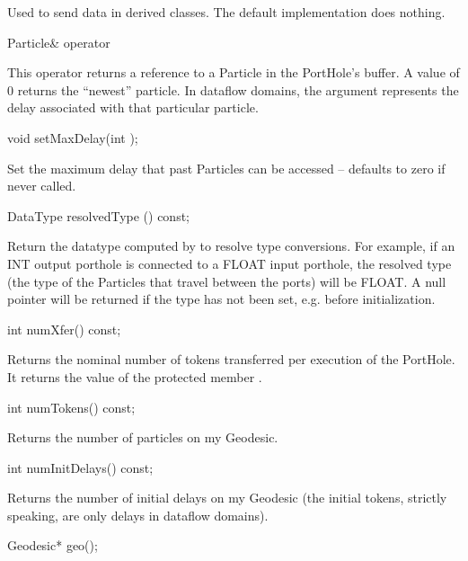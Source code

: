 Used to send data in derived classes.  The default implementation
does nothing.

\begin{example}
Particle& operator %
\end{example}

This operator returns a reference to a Particle in the PortHole's
buffer.  A  value of 0 returns the ``newest'' particle.
In dataflow domains, the argument represents the delay associated
with that particular particle.

\begin{example}
void setMaxDelay(int );
\end{example}

Set the maximum delay that past Particles can be accessed -- defaults to
zero if never called.

\begin{example}
DataType resolvedType () const;
\end{example}

Return the datatype computed by  to resolve
type conversions.  For example, if an INT output porthole is connected
to a FLOAT input porthole, the resolved type (the type of the Particles
that travel between the ports) will be FLOAT.  A null pointer will be
returned if the type has not been set, e.g. before initialization.

\begin{example}
int numXfer() const;
\end{example}

Returns the nominal number of tokens transferred per execution of the
PortHole.  It returns the value of the protected member .

\begin{example}
int numTokens() const;
\end{example}

Returns the number of particles on my Geodesic.

\begin{example}
int numInitDelays() const;
\end{example}

Returns the number of initial delays on my Geodesic (the initial tokens,
strictly speaking, are only delays in dataflow domains).

\begin{example}
Geodesic* geo();
\end{example}

